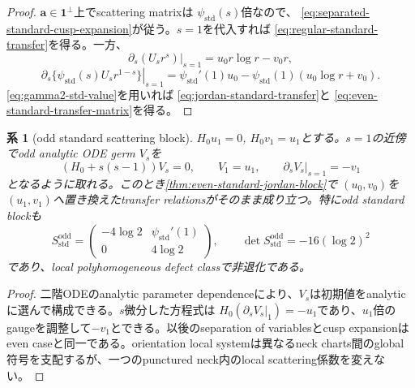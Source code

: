 \documentclass[11pt,a4paper]{ltjsarticle}
\newtheorem{corollary}[theorem]{系}
\theoremstyle{definition}
\theoremstyle{remark}
\newcommand{\one}{\mathbf 1}
\begin{document}
\begin{proof}
$\mathbf a\in\one^\perp$上でscattering matrixは
$\psi_{\mathrm{std}}(s)$倍なので、
\eqref{eq:separated-standard-cusp-expansion}が従う。$s=1$を代入すれば
\eqref{eq:regular-standard-transfer}を得る。一方、
\[
 \left.\partial_s(U_sr^s)\right|_{s=1}
 =u_0r\log r-v_0r,
\]
\[
 \left.\partial_s\{\psi_{\mathrm{std}}(s)
 U_sr^{1-s}\}\right|_{s=1}
 =\psi_{\mathrm{std}}'(1)u_0
 -\psi_{\mathrm{std}}(1)(u_0\log r+v_0).
\]
\eqref{eq:gamma2-std-value}を用いれば
\eqref{eq:jordan-standard-transfer}と
\eqref{eq:even-standard-transfer-matrix}を得る。
\end{proof}

\begin{corollary}[odd standard scattering block]\label{cor:odd-standard-jordan-block}
$H_0u_1=0$, $H_0v_1=u_1$とする。$s=1$の近傍でodd analytic ODE germ $V_s$を
\[
 (H_0+s(s-1))V_s=0,
 \qquad V_1=u_1,
 \qquad \left.\partial_sV_s\right|_{s=1}=-v_1
\]
となるように取れる。このとき\cref{thm:even-standard-jordan-block}で
$(u_0,v_0)$を$(u_1,v_1)$へ置き換えたtransfer relationsがそのまま成り立つ。特にodd standard blockも
\[
 S_{\mathrm{std}}^{\mathrm{odd}}
 =\begin{pmatrix}
 -4\log2&\psi_{\mathrm{std}}'(1)\\
 0&4\log2
 \end{pmatrix},
 \qquad
 \det S_{\mathrm{std}}^{\mathrm{odd}}
 =-16(\log2)^2
\]
であり、local polyhomogeneous defect classで非退化である。
\end{corollary}

\begin{proof}
二階ODEのanalytic parameter dependenceにより、$V_s$は初期値をanalyticに選んで構成できる。$s$微分した方程式は
$H_0(\partial_sV_s|_1)=-u_1$であり、$u_1$倍のgaugeを調整して$-v_1$とできる。以後のseparation of variablesとcusp expansionはeven caseと同一である。orientation local systemは異なるneck charts間のglobal符号を支配するが、一つのpunctured neck内のlocal scattering係数を変えない。
\end{proof}
\end{document}

